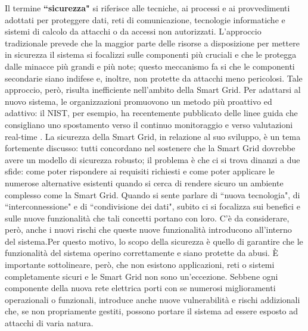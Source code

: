 Il termine \textbf{``sicurezza"} si riferisce alle tecniche, ai processi e ai provvedimenti adottati per proteggere dati, reti di comunicazione, tecnologie informatiche e sistemi di calcolo da attacchi o da accessi non autorizzati. \newline
L'approccio tradizionale prevede che la maggior parte delle risorse a disposizione per mettere in sicurezza il sistema si focalizzi sulle componenti più cruciali e che le protegga dalle minacce più grandi e più note; questo meccanismo fa si che le componenti secondarie siano indifese e, inoltre, non protette da attacchi meno pericolosi. Tale approccio, però, risulta inefficiente nell'ambito della Smart Grid. \newline Per adattarsi al nuovo sistema, le organizzazioni promuovono un metodo più proattivo ed adattivo: il NIST, per esempio, ha recentemente pubblicato delle linee guida che consigliano uno spostamento verso il continuo monitoraggio e verso valutazioni real-time \cite{smartgrids}.\newline \newline
La sicurezza della Smart Grid, in relazione al suo sviluppo, è un tema fortemente discusso: tutti concordano nel sostenere che la Smart Grid dovrebbe avere un modello di sicurezza robusto; il problema è che ci si trova dinanzi a due sfide: come poter rispondere ai requisiti richiesti e come poter applicare le numerose alternative esistenti quando si cerca di rendere sicuro un ambiente complesso come la Smart Grid.
\newline \newline
Quando si sente parlare di ``nuova tecnologia", di ``interconnessione" e di ``condivisione dei dati", subito ci si focalizza sui benefici e sulle nuove funzionalità che tali concetti portano con loro. C'è da considerare, però, anche i nuovi rischi che queste nuove funzionalità introducono all'interno del sistema.\newline Per questo motivo, lo scopo della sicurezza è quello di garantire che le funzionalità del sistema operino correttamente e siano protette da abusi. È importante sottolineare, però, che non esistono applicazioni, reti o sistemi completamente sicuri e le Smart Grid non sono un'eccezione. Sebbene ogni componente della nuova rete elettrica porti con se numerosi miglioramenti operazionali  o funzionali, introduce anche nuove vulnerabilità e rischi addizionali che, se non propriamente gestiti, possono portare il sistema ad essere esposto ad attacchi di varia natura.
